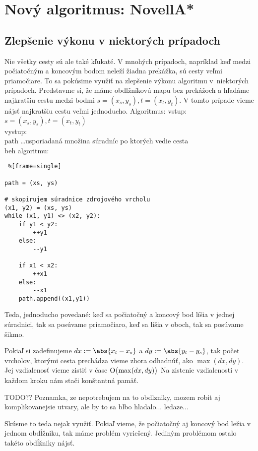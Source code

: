 \chapter{Nový algoritmus: NovellA*}

\section{Zlepšenie výkonu v niektorých prípadoch}
Nie všetky cesty sú ale také kľukaté. V mnohých prípadoch, napríklad keď medzi počiatočným a koncovým bodom neleží žiadna prekážka, 
sú cesty veľmi priamočiare. To sa pokúsime využiť na zlepšenie výkonu algoritmu v~niektorých prípadoch. 
Predstavme si, že máme obdlžníkovú mapu bez prekážoch a hľadáme najkratšiu cestu medzi bodmi $s=(x_s,y_s), t=(x_t,y_t)$.
V tomto prípade vieme nájsť najkratšiu cestu veľmi jednoducho.
Algoritmus:
vstup: \\
$s=(x_s,y_s), t=(x_t,y_t)$ \\
vystup:\\
path \dots usporiadaná množina súradníc po ktorých vedie cesta\\
beh algoritmu:\\


\lstset{language=Python}          
\begin{lstlisting} %[frame=single]  

path = (xs, ys)

# skopirujem súradnice zdrojového vrcholu
(x1, y2) = (xs, ys) 
while (x1, y1) <> (x2, y2):
	if y1 < y2:
		++y1
	else:
		--y1

	if x1 < x2:
		++x1
	else:
		--x1
	path.append((x1,y1))
\end{lstlisting}

Teda, jednoducho povedané: keď sa počiatočný a koncový bod líšia v jednej súradnici, tak sa posúvame priamočiaro,
keď sa líšia v oboch, tak sa posúvame šikmo.

Pokiaľ si zadefinujeme $dx := \abs{x_t - x_s}$ a $dy := \abs{y_t - y_s}$, tak počet vrcholov,
ktorými cesta prechádza vieme zhora odhadnúť, ako $\max(dx, dy)$. Jej vzdialenosť vieme zistiť v čase  $\operatorname{O}\bigl(\max(dx, dy)\bigr)$
Na zistenie vzdialenosti v každom kroku nám stači konštantná pamäť.

TODO?? Poznamka, ze nepotrebujem na to obdlzniky, mozem robit aj komplikovanejsie utvary, ale by to sa blbo hladalo... ledaze...

Skúsme to teda nejak využiť. Pokiaľ vieme, že počiatočný aj koncový bod ležia v jednom obdĺžniku, tak máme problém vyriešený. 
Jediným problémom ostalo takéto obdĺžniky nájsť. 


